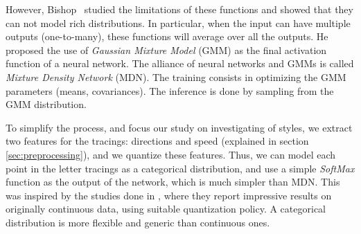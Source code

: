 \documentclass[conference]{IEEEtran}
\begin{document}
However, Bishop~\cite{bishop1994mixture} studied the limitations of these functions and showed that they can not model rich distributions. In particular, when the input can have multiple outputs (one-to-many), these functions will average over all the outputs. He proposed the use of \textit{Gaussian Mixture Model} (GMM) as the final activation function of a neural network. The alliance of neural networks and GMMs is called \textit{Mixture Density Network} (MDN). The training consists in optimizing the GMM parameters (means, covariances). The inference is done by sampling from the GMM distribution. %

To simplify the process, and focus our study on investigating of styles, we extract two features for the tracings: directions and speed (explained in section \ref{sec:preprocessing}), and we quantize these features. Thus, we can model each point in the letter tracings as a categorical distribution, and use a simple \textit{SoftMax} function as the output of the network, which is much simpler than MDN. This was inspired by the studies done in \cite{oord2016wavenet,VanDenOord:2016:PRN:3045390.3045575}, where they report impressive results on originally continuous data, using suitable quantization policy. A categorical distribution is more flexible and generic than continuous ones.
\end{document}
